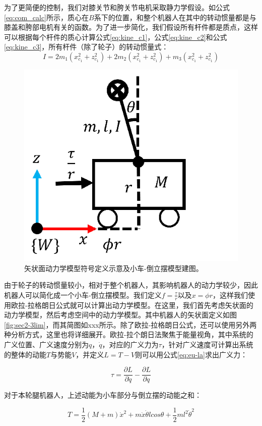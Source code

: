 为了更简便的控制，我们对膝关节和胯关节电机采取静力学假设。如公式\ref{eq:com_calc}所示，质心在${B}$系下的位置，和整个机器人在其中的转动惯量都是与膝盖和胯部电机有关的函数。为了进一步简化，我们假设所有杆件都是质点，这样可以根据每个杆件的质心计算公式\ref{eq:kine_c1}，公式\ref{eq:kine_c2}和公式\ref{eq:kine_c3}，所有杆件（除了轮子）的转动惯量式：
\begin{equation}
    I = 2m_1 (x_{c_1}^2+z_{c_1}^2) + 2m_2 (x_{c_1}^2+z_{c_1}^2) + m_3 (x_{c_1}^2+z_{c_1}^2)
    \label{eq:inertia}
\end{equation}

\begin{figure}
  \centering
  \includegraphics[width=0.4\linewidth]{figures/Sec4/2dsimple.png}
  \caption{
  矢状面动力学模型符号定义示意及小车-倒立摆模型建图。
  }
  \label{fig:sec4-2dsimple}
   \vspace{6pt}
\end{figure}

由于轮子的转动惯量较小，相对于整个机器人，其影响机器人的动力学较少，因此机器人可以简化成一个小车-倒立摆模型。我们定义$f = \frac{\tau}{r}$以及$x = \phi r$，这样我们使用欧拉-拉格朗日公式就可以计算出动力学模型。在这里，我们首先考虑矢状面的动力学模型，然后考虑空间中的动力学模型。其中机器人的矢状面定义如图\ref{fig:sec2-3lim}，而其简图如xxx所示。除了欧拉-拉格朗日公式，还可以使用另外两种分析方式，这里也将详细展开。欧拉-拉个朗日法聚焦于能量视角，其中系统的广义位置、广义速度分别为$q$，$\dot{q}$，对应的广义力为$   \tau$，针对广义速度可计算出系统的整体的动能$T$与势能$V$，并定义$L=T-V$则可以用公式\ref{eq:eu-la}求出广义力：

\begin{equation}
    \tau = \frac{\partial L}{\partial \dot{q}} - \frac{\partial L}{\partial q}
    \label{eq:eu-la}
\end{equation}

对于本轮腿机器人，上述动能为小车部分与倒立摆的动能之和：

\begin{equation}
    T=\frac{1}{2}(M+m)\dot{x}^2 + m\dot{x} \dot{\theta} l cos \theta + \frac{1}{2} m l^2 \dot{\theta}^2
    \label{eq:la-T}
\end{equation}

